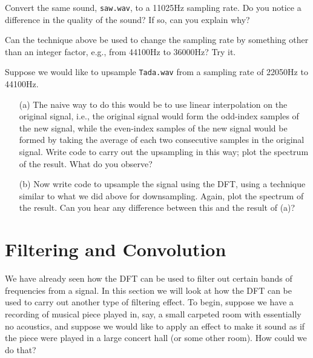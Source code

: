 \begin{problem}
Convert the same sound, \texttt{saw.wav}, to a 11025Hz sampling rate. Do you notice a difference in the quality of the sound? If so, can you explain why?
\end{problem}

\begin{problem}
Can the technique above be used to change the sampling rate by something other than an integer factor, e.g., from 44100Hz to 36000Hz? Try it.
\end{problem}

\begin{problem}
Suppose we would like to upsample \texttt{Tada.wav} from a sampling rate of 22050Hz to 44100Hz. \begin{enumerate}
\item[(a)]
The naive way to do this would be to use linear interpolation on the original signal, i.e., the original signal would form the odd-index samples of the new signal, while the even-index samples of the new signal would be formed by taking the average of each two consecutive samples in the original signal. Write code to carry out the upsampling in this way; plot the spectrum of the result. What do you observe?
\item[(b)]Now write code to upsample the signal using the DFT, using a technique similar to what we did above for downsampling. Again, plot the spectrum of the result. Can you hear any difference between this and the result of (a)?
\end{enumerate}
\end{problem}

\section*{Filtering and Convolution}

We have already seen how the DFT can be used to filter out certain bands of frequencies from a signal. In this section we will look at how the DFT can be used to carry out another type of filtering effect. To begin, suppose we have a recording of musical piece played in, say, a small carpeted room with essentially no acoustics, and suppose we would like to apply an effect to make it sound as if the piece were played in a large concert hall (or some other room). How could we do that?

